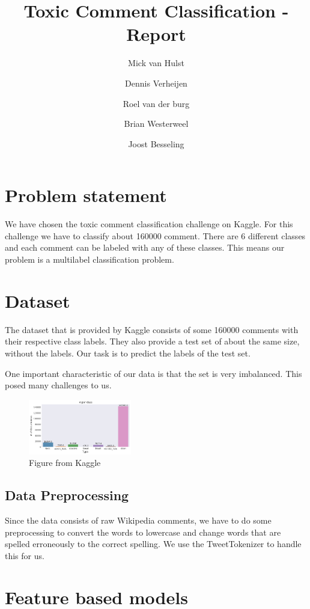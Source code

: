 \documentclass[10pt, a4paper,twocolumn]{article}
\title{Toxic Comment Classification - Report}
\author{Mick van Hulst \and Dennis Verheijen \and Roel van der burg \and Brian Westerweel \and Joost Besseling}
\begin{document}
	\maketitle
	
	
	\section{Problem statement}
	We have chosen the toxic comment classification challenge on Kaggle. For this challenge we have to classify about 160000 comment. There are 6 different classes and each comment can be labeled with any of these classes. This means our problem is a multilabel classification problem.
	
	\section{Dataset}
	
	The dataset that is provided by Kaggle consists of some 160000 comments with their respective class labels. They also provide a test set of about the same size, without the labels. Our task is to predict the labels of the test set.
	
	One important characteristic of our data is that the set is very imbalanced. This posed many challenges to us.
	
	\begin{figure}[h]
		\includegraphics[width=0.4\textwidth]{img/distribution_histogram}
		\caption{Figure from Kaggle \cite{abc}}
	\end{figure}
	
	
	\subsection*{Data Preprocessing}
	
	Since the data consists of raw Wikipedia comments, we have to do some preprocessing to convert the words to lowercase and change words that are spelled erroneously to the correct spelling. We use the TweetTokenizer to handle this for us.
	
	\section{Feature based models}
\end{document}
